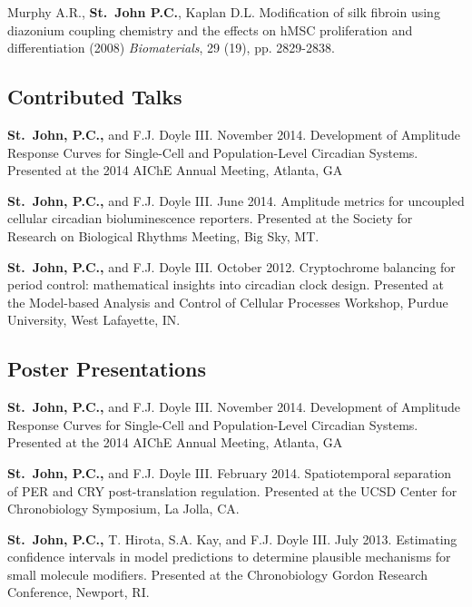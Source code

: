 {Murphy A.R., {\bf St.\ John P.C.}, Kaplan D.L. Modification of silk fibroin using diazonium coupling chemistry and the effects on hMSC proliferation and differentiation (2008) {\em Biomaterials}, 29 (19), pp. 2829-2838.  

\subsection*{Contributed Talks}
{\bfseries St.\ John, P.C.,} and F.J. Doyle III. November 2014. Development of Amplitude Response Curves for Single-Cell and Population-Level Circadian Systems. Presented at the 2014 AIChE Annual Meeting, Atlanta, GA


{\bfseries St.\ John, P.C.,} and F.J. Doyle III. June 2014. Amplitude metrics for uncoupled cellular circadian bioluminescence reporters. Presented at the Society for Research on Biological Rhythms Meeting, Big Sky, MT.

{\bfseries St.\ John, P.C.,} and F.J. Doyle III. October 2012. Cryptochrome balancing for period control: mathematical insights into circadian clock design. Presented at the Model-based Analysis and Control of Cellular Processes Workshop, Purdue University, West Lafayette, IN.

\subsection*{Poster Presentations}
{\bfseries St.\ John, P.C.,} and F.J. Doyle III. November 2014. Development of Amplitude Response Curves for Single-Cell and Population-Level Circadian Systems. Presented at the 2014 AIChE Annual Meeting, Atlanta, GA

{\bfseries St.\ John, P.C.,} and F.J. Doyle III. February 2014. Spatiotemporal
separation of PER and CRY post-translation regulation. Presented at the UCSD
Center for Chronobiology Symposium, La Jolla, CA.

{\bfseries St.\ John, P.C.,} T. Hirota, S.A. Kay, and F.J. Doyle III. July 2013. Estimating confidence intervals in model predictions to determine plausible mechanisms for small molecule modifiers. Presented at the Chronobiology Gordon Research Conference, Newport, RI.

}
